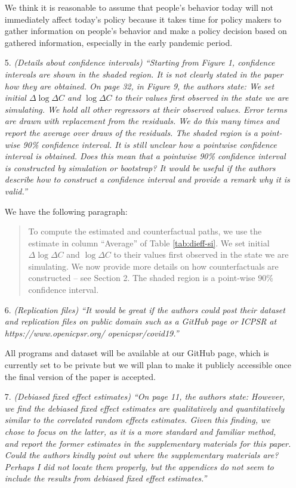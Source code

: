 \documentclass[11pt]{article}
\begin{document}
\begin{itemize}
We think it is reasonable to assume that people's behavior today will not immediately affect today's policy because it takes time for policy makers to gather information on people's behavior and make a policy decision based on gathered information, especially in the early pandemic period.  
  
\item[5.]  \textit{(Details about confidence intervals) ``Starting from Figure 1, confidence intervals are shown
in the shaded region. It is not clearly stated in the paper how they are obtained. On page 32,
in Figure 9, the authors state:
We set initial $\Delta\log\Delta C$ and $\log\Delta C$  to their values first observed in the state we
are simulating. We hold all other regressors at their observed values. Error terms
are drawn with replacement from the residuals. We do this many times and report
the average over draws of the residuals. The shaded region is a point-wise 90\%
confidence interval. It is still unclear how a pointwise confidence interval is obtained. Does this mean that a pointwise
90\% confidence interval is constructed by simulation or bootstrap? It would be useful if the authors describe how to construct a confidence interval and provide a remark why it is valid.''}

We have the following paragraph:
\begin{quote}
 To compute the estimated and counterfactual
paths, we use the   estimate   in
column ``Average'' of Table \ref{tab:dieff-si}. We set initial
$\Delta \log \Delta C$ and $\log \Delta C$ to their values first
observed in the state we are simulating. We now provide
more details on how counterfactuals are constructed -- see Section 2.
The shaded region is a point-wise 90\% confidence
interval.
\end{quote}
  
\item[6.]  \textit{(Replication files) ``It would be great if the authors could post their dataset and replication
files on public domain such as a GitHub page or ICPSR at https://www.openicpsr.org/
openicpsr/covid19.''}

All programs and dataset will be available at our GitHub page, which is currently set to be private but we will plan to make it publicly accessible once the final version of the paper is accepted.
  
\item[7.]  \textit{(Debiased fixed effect estimates) ``On page 11, the authors state:
However, we find the debiased fixed effect estimates are qualitatively and quantitatively
similar to the correlated random effects estimates. Given this finding,
we chose to focus on the latter, as it is a more standard and familiar method, and
report the former estimates in the supplementary materials for this paper.
Could the authors kindly point out where the supplementary materials are? Perhaps I did not
locate them properly, but the appendices do not seem to include the results from debiased
fixed effect estimates.''}


\end{itemize}
\end{document}
